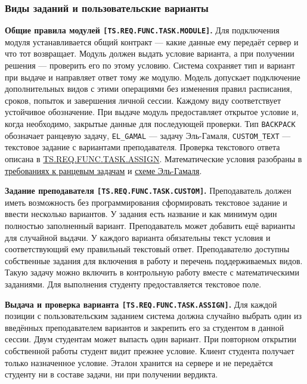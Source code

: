 \documentclass[12pt,a4paper]{article}
\begin{document}
\subsubsection{Виды заданий и пользовательские варианты}\label{ux432ux438ux434ux44b-ux437ux430ux434ux430ux43dux438ux439-ux438-ux43fux43eux43bux44cux437ux43eux432ux430ux442ux435ux43bux44cux441ux43aux438ux435-ux432ux430ux440ux438ux430ux43dux442ux44b}

\hypertarget{виды-заданий-и-пользовательские-варианты}{}

\hypertarget{ts-req-func-task-module}{} \textbf{Общие правила модулей \texttt{[TS.\allowbreak{}REQ.\allowbreak{}FUNC.\allowbreak{}TASK.\allowbreak{}MODULE]}.} Для подключения модуля устанавливается общий контракт --- какие данные ему передаёт сервер и что тот возвращает. Модуль должен выдать условие варианта, а при получении решения --- проверить его по этому условию. Система сохраняет тип и вариант при выдаче и направляет ответ тому же модулю. Модель допускает подключение дополнительных видов с этими операциями без изменения правил расписания, сроков, попыток и завершения личной сессии. Каждому виду соответствует устойчивое обозначение. При выдаче модуль предоставляет открытое условие и, когда необходимо, закрытые данные для последующей проверки. Тип \texttt{BACKPACK} обозначает ранцевую задачу, \texttt{EL\_GAMAL} --- задачу Эль-Гамаля, \texttt{CUSTOM\_\allowbreak{}TEXT} --- текстовое задание с вариантами преподавателя. Проверка текстового ответа описана в {\hyperlink{ts-req-func-task-assign}{TS.REQ.FUNC.TASK.ASSIGN}}. Математические условия разобраны в {\hyperlink{ts-req-func-prob-backpack-si}{требованиях к ранцевым задачам}} и {\hyperlink{ts-req-func-prob-elgamal}{схеме Эль-Гамаля}}.

\hypertarget{ts-req-func-task-custom}{} \textbf{Задание преподавателя \texttt{[TS.\allowbreak{}REQ.\allowbreak{}FUNC.\allowbreak{}TASK.\allowbreak{}CUSTOM]}.} Преподаватель должен иметь возможность без программирования сформировать текстовое задание и ввести несколько вариантов. У задания есть название и как минимум один полностью заполненный вариант. Преподаватель может добавить ещё варианты для случайной выдачи. У каждого варианта обязательны текст условия и соответствующий ему правильный текстовый ответ. Преподавателю доступны собственные задания для включения в работу и перечень поддерживаемых видов. Такую задачу можно включить в контрольную работу вместе с математическими заданиями. Для выполнения студенту предоставляется текстовое поле.

\hypertarget{ts-req-func-task-assign}{} \textbf{Выдача и проверка варианта \texttt{[TS.\allowbreak{}REQ.\allowbreak{}FUNC.\allowbreak{}TASK.\allowbreak{}ASSIGN]}.} Для каждой позиции с пользовательским заданием система должна случайно выбрать один из введённых преподавателем вариантов и закрепить его за студентом в данной сессии. Двум студентам может выпасть один вариант. При повторном открытии собственной работы студент видит прежнее условие. Клиент студента получает только назначенное условие. Эталон хранится на сервере и не передаётся студенту ни в составе задачи, ни при получении вердикта.
\end{document}
